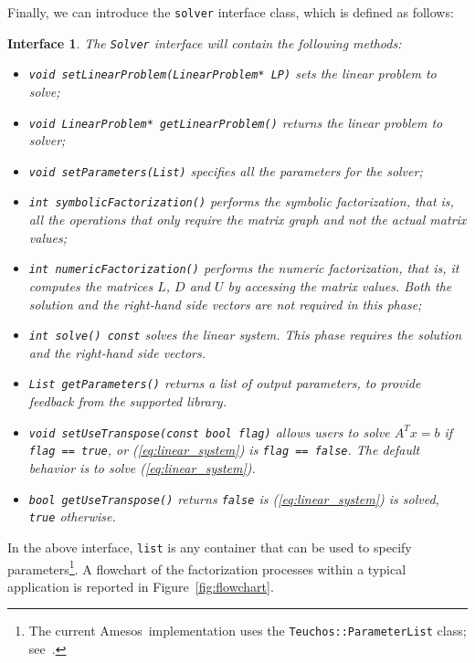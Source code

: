 \documentclass[acmtoms,acmnow]{acmtrans2m}
\newcommand{\amesos}{{\sc Amesos}}
\newtheorem{interface}{Interface}[section]
\begin{document}
\smallskip

Finally, we can introduce the {\tt solver} interface class, which is defined as
follows:
\begin{interface}
\label{int:asi}
The {\tt Solver} interface
will contain the following methods:
\begin{itemize}
\item \verb!void setLinearProblem(LinearProblem* LP)! sets the linear problem
to solve;
\item \verb!void LinearProblem* getLinearProblem()! returns the linear problem
to solver;
\item \verb!void setParameters(List)! specifies all the parameters for the solver;
\item \verb!int symbolicFactorization()! performs the symbolic factorization, that
is, all the operations that only require the matrix graph and not
the actual matrix values;
\item \verb!int numericFactorization()! performs the numeric factorization, that
is, it computes the matrices $L$, $D$ and $U$ by accessing the matrix values.
Both the solution and the right-hand side vectors are not required in this phase;
\item \verb!int solve() const! solves the linear system. This phase requires the
solution and the right-hand side vectors.
\item \verb!List getParameters()! returns a list of output parameters, to
provide feedback from the supported library.
\item \verb!void setUseTranspose(const bool flag)! allows users to solve $A^T x =
b$ if \verb!flag == true!, or (\ref{eq:linear_system}) is \verb!flag == false!. The default behavior is to solve
(\ref{eq:linear_system}).
\item \verb!bool getUseTranspose()! returns \verb!false! is
(\ref{eq:linear_system}) is solved, \verb!true! otherwise.
\end{itemize}
\end{interface}
In the above interface, {\tt list} is any container that can be used
to specify parameters\footnote{The current \amesos\ implementation uses the
{\tt Teuchos::ParameterList} class; see~\cite{Teuchos-Home-Page}.}. 
A flowchart of the factorization processes
within a typical application is reported in
Figure~\ref{fig:flowchart}.
\end{document}
